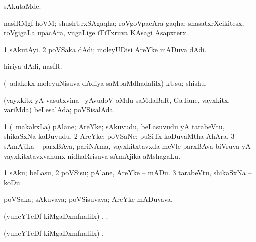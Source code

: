 \bentry
{}
\gl{\nA}
\bmng
sAkutaMde. 
\emng
\eentry

\bentry
{}
\gl{\nA}
\bmng
nasiRMgf hoVM; shushUrxSAgaqha; roVgoVpacAra gaqha; shasatxrXcikitesx, roVgigaLa upacAra, \mo vugaLige iTiTxruva KAsagi Asapxterx. 
\emng
\eentry

\bentry
{}
\gl{\nA}
\bmng
\bnum
\num{1} sAkutAyi. 
\num{2} poVSaka dAdi; moleyUDisi AreYke mADuva dAdi. 
\enum
\emng
\eentry

\bentry
{}
\gl{\nA}
\bmng
hiriya dAdi, nasfR. 
\emng
\eentry

\bentry
{}
\gl{\nA}
\bmng
(\kanmu\ adakekx moleyuNisuva dAdiya saMbaMdhadalilx) kUsu; shishu. 
\emng

\noindent
\gl{\pagu}
\bmng
{} (vayxkitx yA vasutxvina \vi\ yAvudoV oMdu saMdaBaR, GaTane, vayxkitx, \mo variMda) beLesalAda; poVSisalAda. 
\emng
\eentry

\bentry
{}
\gl{\nA}
\bmng
\bnum
\num{1} (\kanmu\ makakxLa) pAlane; AreYke; sAkuvudu, beLasuvudu yA tarabeVtu, shikaSxNa koDuvudu. 
\num{2} AreYke; poVSaNe; puSiTx koDuvaMtha AhAra. 
\num{3} sAmAjika -- parxBAva, pariNAma, vayxkitxtavxda meVle parxBAva biVruva yA vayxkitxtavxvanunx nidhaRrisuva sAmAjika aMshagaLu. 
\enum
\emng
\eentry

\bentry
{}
\gl{\sakirx}
\bmng
\bnum
\num{1} sAku; beLasu, 
\num{2} poVSisu; pAlane, AreYke -- mADu. 
\num{3} tarabeVtu, shikaSxNa -- koDu. 
\enum
\emng
\eentry

\bentry
{}
\gl{\nA}
\bmng
poVSaka; sAkuvava; poVSisuvava; AreYke mADuvava. 
\emng
\eentry

\bentry
{}
\gl{\saMkiSx}
\bmng
(yuneYTeDf kiMgaDxmfnalilx) 
\banum
{} . 
 . 
\eanum
\emng
\eentry

\bentry
{}
\gl{\saMkiSx}
\bmng
(yuneYTeDf kiMgaDxmfnalilx) . 
\emng
\eentry

